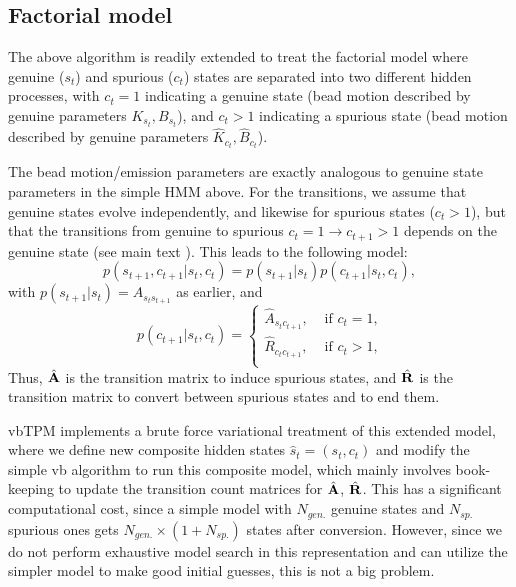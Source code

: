 \subsection{Factorial model}
The above algorithm is readily extended to treat the factorial model
where genuine ($s_t$) and spurious ($c_t$) states are separated into
two different hidden processes, with $c_t=1$ indicating a genuine
state (bead motion described by genuine parameters $K_{s_t},B_{s_t}$),
and $c_t>1$ indicating a spurious state (bead motion described by
genuine parameters $\hat K_{c_t},\hat B_{c_t}$). 

The bead motion/emission parameters are exactly analogous to genuine
state parameters in the simple HMM above. For the transitions, we
assume that genuine states evolve independently, and likewise for
spurious states ($c_t>1$), but that the transitions from genuine to
spurious $c_t=1 \to c_{t+1}>1$ depends on the genuine state (see main
text \cite{vbTPMpaper}). This leads to the following model:
\begin{equation}
  p(s_{t+1},c_{t+1}|s_t,c_t)=p(s_{t+1}|s_t)p(c_{t+1}|s_t,c_t),
\end{equation}
with $p(s_{t+1}|s_t)=A_{s_ts_{t+1}}$ as earlier, and
\begin{equation}
  p(c_{t+1}|s_t,c_t)
  =\left\{
  \begin{array}{ll}
    \hat A_{s_tc_{t+1}},&\text{ if $c_t=1$,}\\
    \hat R_{c_tc_{t+1}},&\text{ if $c_t>1$,}\\
  \end{array}
  \right.
\end{equation}
Thus, $\hat{\mathbf{A}}$ is the transition matrix to induce spurious
states, and $\hat{\mathbf{R}}$ is the transition matrix to convert
between spurious states and to end them.

vbTPM implements a brute force variational treatment of this extended
model, where we define new composite hidden states $\hat
s_t=(s_t,c_t)$ and modify the simple vb algorithm to run this
composite model, which mainly involves book-keeping to update the
transition count matrices for $\hat{\mathbf{A}}$, $\hat{\mathbf{R}}$.
This has a significant computational cost, since a simple model with
$N_{gen.}$ genuine states and $N_{sp.}$ spurious ones gets
$N_{gen.}\times(1+N_{sp.})$ states after conversion. However, since we
do not perform exhaustive model search in this representation and can
utilize the simpler model to make good initial guesses, this is not a
big problem.

